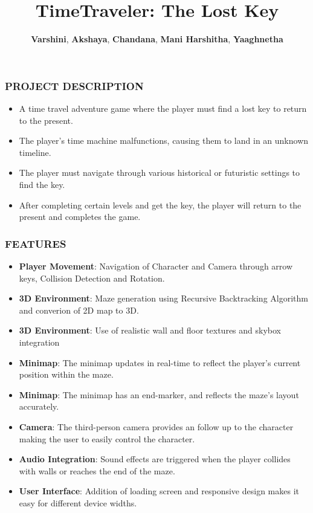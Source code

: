 \documentclass[9pt]{beamer}
\title{\textbf{TimeTraveler: The Lost Key}}
\author{ \textbf{Varshini}, \textbf{Akshaya}, \textbf{Chandana}, \textbf{Mani Harshitha}, \textbf{Yaaghnetha}}
\begin{document}
\begin{frame}
\titlepage
\end{frame}

\begin{frame}
    \frametitle{PROJECT DESCRIPTION}
    \begin{itemize}
        \item A time travel adventure game where the player must find a lost key to return to the present.
        \item The player’s time machine malfunctions, causing them to land in an unknown timeline.
        \item The player must navigate through various historical or futuristic settings to find the key.
        \item After completing certain levels and get the key, the player will return to the present and completes the game.
    \end{itemize}
\end{frame}


\begin{frame}
    \frametitle{FEATURES}
    \begin{itemize}
        \item \textbf{Player Movement}: Navigation of Character and Camera through arrow keys, Collision Detection and Rotation.
        \item \textbf{3D Environment}: Maze generation using Recursive Backtracking Algorithm and converion of 2D map to 3D. 
        \item \textbf{3D Environment}: Use of realistic wall and floor textures and skybox integration
        \item \textbf{Minimap}: The minimap updates in real-time to reflect the player’s current position within the maze.
        \item \textbf{Minimap}: The minimap has an end-marker, and reflects the maze's layout accurately.
        \item \textbf{Camera}: The third-person camera provides an follow up to the character making the user to easily control the character.
        \item \textbf{Audio Integration}: Sound effects are triggered when the player collides with walls or reaches the end of the maze.
        \item \textbf{User Interface}: Addition of loading screen and responsive design makes it easy for different device widths.
    \end{itemize}
\end{frame}
\end{document}
